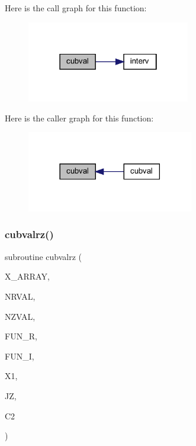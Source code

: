 Here is the call graph for this function\+:\nopagebreak
\begin{figure}[H]
\begin{center}
\leavevmode
\includegraphics[width=202pt]{Leroi_8f90_a7cfee47c046d9dadca7ccd1059bd30ac_cgraph}
\end{center}
\end{figure}
Here is the caller graph for this function\+:\nopagebreak
\begin{figure}[H]
\begin{center}
\leavevmode
\includegraphics[width=206pt]{Leroi_8f90_a7cfee47c046d9dadca7ccd1059bd30ac_icgraph}
\end{center}
\end{figure}
\mbox{\label{Leroi_8f90_a7ac3bb5f2b2d31402aa81424ee2be857}} 
\subsubsection{\texorpdfstring{cubvalrz()}{cubvalrz()}}
{\footnotesize\ttfamily subroutine cubvalrz (\begin{DoxyParamCaption}\item[{real, dimension(nrval)}]{X\+\_\+\+A\+R\+R\+AY,  }\item[{integer}]{N\+R\+V\+AL,  }\item[{integer}]{N\+Z\+V\+AL,  }\item[{real, dimension(4,nrval,nzval)}]{F\+U\+N\+\_\+R,  }\item[{real, dimension(4,nrval,nzval)}]{F\+U\+N\+\_\+I,  }\item[{real}]{X1,  }\item[{integer}]{JZ,  }\item[{complex}]{C2 }\end{DoxyParamCaption})}

